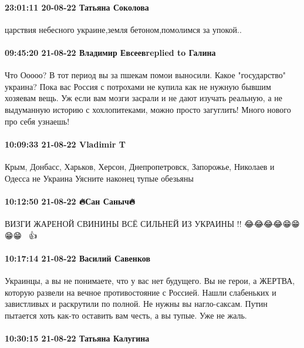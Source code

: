 \paragraph{23:01:11 20-08-22 Татьяна Соколова}

царствия небесного украине,земля бетоном,помолимся за упокой..

\paragraph{09:45:20 21-08-22 Владимир Евсеевreplied to Галина}

Что Ооооо? В тот период вы за пшекам помои выносили. Какое "государство"
украина? Пока вас Россия с потрохами не купила как не нужную бывшим хозяевам
вещь. Уж если вам мозги засрали и не дают изучать реальную, а не выдуманную
историю с хохлопитеками, можно просто загуглить! Много нового про себя узнаешь!

\paragraph{10:09:33 21-08-22 Vladimir T}

Крым, Донбасс, Харьков, Херсон, Днепропетровск, Запорожье, Николаев и Одесса не Украина
Уясните наконец тупые обезьяны

\paragraph{10:12:50 21-08-22 🔥Сан Саныч🔥}

ВИЗГИ ЖАРЕНОЙ СВИНИНЫ
ВСЁ СИЛЬНЕЙ ИЗ УКРАИНЫ !!
😂😂😂😂😁😁😁😁🐷🐷🐷👍

\paragraph{10:17:14 21-08-22 Василий Савенков}

Украинцы, а вы не понимаете, что у вас нет будущего. Вы не герои, а ЖЕРТВА,
которую развели на вечное противостояние с Россией. Нашли слабеньких и
завистливых и раскрутили по полной. Не нужны вы нагло-саксам. Путин пытается
хоть как-то оставить вам честь, а вы тупые. Уже не жаль.

\paragraph{10:30:15 21-08-22 Татьяна Калугина}

